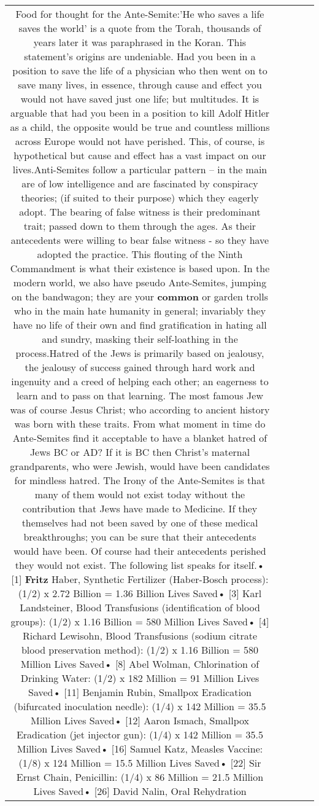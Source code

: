 \documentclass[11pt]{article}
\newlength\mylength
\begin{document}
\begin{center}
\begin{longtable}{|C{.65\mylength}|C{.30\mylength}|C{.12\mylength}|C{.12\mylength}|C{.12\mylength}|}
  \small Food for thought for the Ante-Semite:'He who saves a life saves the world' is a quote from the Torah, thousands of years later it was paraphrased in the Koran. This statement's origins are undeniable. Had you been in a position to save the life of a physician who then went on to save many lives, in essence, through cause and effect you would not have saved just one life; but multitudes. It is arguable that had you been in a position to kill Adolf Hitler as a child, the opposite would be true and countless millions across Europe would not have perished. This, of course, is hypothetical but cause and effect has a vast impact on our lives.Anti-Semites follow a particular pattern – in the main are of low intelligence and are fascinated by conspiracy theories; (if suited to their purpose) which they eagerly adopt. The bearing of false witness is their predominant trait; passed down to them through the ages. As their antecedents were willing to bear false witness - so they have adopted the practice. This flouting of the Ninth Commandment is what their existence is based upon.  In the modern world, we also have pseudo Ante-Semites, jumping on the bandwagon; they are your \textbf{common} or garden trolls who in the main hate humanity in general; invariably  they have no life of their own and find gratification in hating all and sundry, masking their self-loathing in the process.Hatred of the Jews is primarily based on jealousy, the jealousy of success gained through hard work and ingenuity and a creed of helping each other; an eagerness to learn and to pass on that learning. The most famous Jew was of course Jesus Christ; who according to ancient history was born with these traits. From what moment in time do Ante-Semites find it acceptable to have a blanket hatred of Jews BC or AD? If it is BC then Christ's maternal grandparents, who were Jewish, would have been candidates for mindless hatred. The Irony of the Ante-Semites is that many of them would not exist today without the contribution that Jews have made to Medicine. If they themselves had not been saved by one of these medical breakthroughs; you can be sure that their antecedents would have been. Of course had their antecedents perished they would not exist.  The following list speaks for itself.• [1] \textbf{Fritz} Haber, Synthetic Fertilizer (Haber-Bosch process): (1/2) x 2.72 Billion = 1.36 Billion Lives Saved• [3] Karl Landsteiner, Blood Transfusions (identification of blood groups): (1/2) x 1.16 Billion = 580 Million Lives Saved• [4] Richard Lewisohn, Blood Transfusions (sodium citrate blood preservation method): (1/2) x 1.16 Billion = 580 Million Lives Saved• [8] Abel Wolman, Chlorination of Drinking Water: (1/2) x 182 Million = 91 Million Lives Saved• [11] Benjamin Rubin, Smallpox Eradication (bifurcated inoculation needle): (1/4) x 142 Million = 35.5 Million Lives Saved• [12] Aaron Ismach, Smallpox Eradication (jet injector gun): (1/4) x 142 Million = 35.5 Million Lives Saved• [16] Samuel Katz, Measles Vaccine: (1/8) x 124 Million = 15.5 Million Lives Saved• [22] Sir Ernst Chain, Penicillin: (1/4) x 86 Million = 21.5 Million Lives Saved• [26] David Nalin, Oral Rehydration 
\end{longtable}
\end{center}
\end{document}
